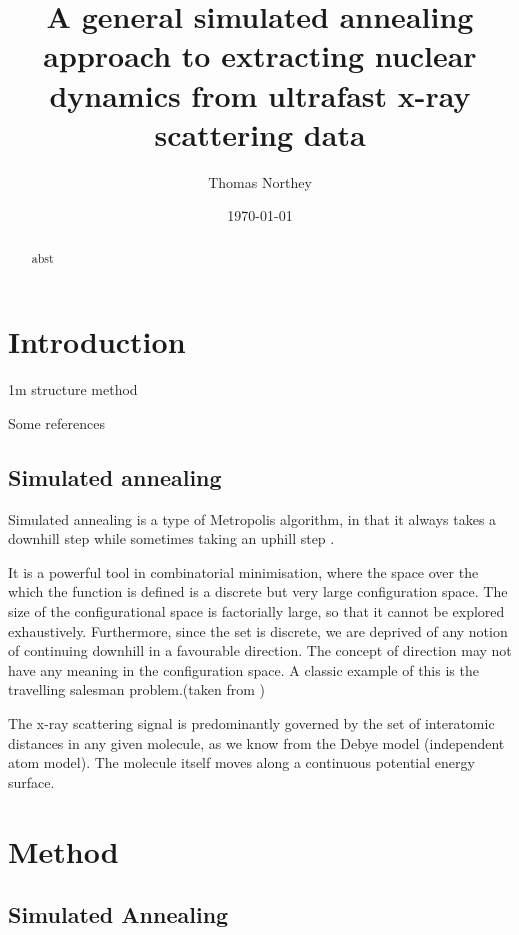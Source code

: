 \documentclass[]{article}
\title{A general simulated annealing approach to extracting nuclear dynamics from ultrafast x-ray scattering data}
\author{Thomas Northey}
\date{\today}
\begin{document}
	
	\maketitle
	
	\begin{abstract}
		abst
	\end{abstract}
	
	\section{Introduction}
	1m structure method \cite{yong2021determination}
	
	Some references \cite{yong2019scattering,yong2021determination,stankus2019ultrafast,wolf2019photochemical,moreno2019ab,northey2014ab,northey2016elastic}
	
	\subsection{Simulated annealing}
	
	Simulated annealing is a type of Metropolis algorithm, in that it always takes a downhill step while sometimes taking an uphill step \cite{press2007numerical}.
	
	It is a powerful tool in combinatorial minimisation, where the space over the which the function is defined is a discrete but very large configuration space. The size of the configurational space is factorially large, so that it cannot be explored exhaustively. Furthermore, since the set is discrete, we are deprived of any notion of continuing downhill in a favourable direction. The concept of direction may not have any meaning in the configuration space. A classic example of this is the travelling salesman problem.(taken from \cite{press2007numerical})
	
	
	The x-ray scattering signal is predominantly governed by the set of interatomic distances in any given molecule, as we know from the Debye model (independent atom model). The molecule itself moves along a continuous potential energy surface.
	
	
	\section{Method}
	
	\subsection{Simulated Annealing}
	
\end{document}
